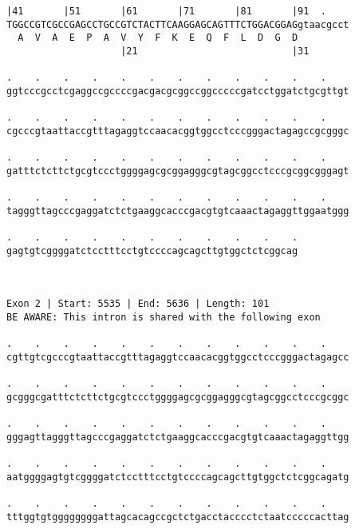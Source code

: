 \documentclass{article}
\begin{document}
\begin{Verbatim}
|41       |51       |61       |71       |81       |91  .    
TGGCCGTCGCCGAGCCTGCCGTCTACTTCAAGGAGCAGTTTCTGGACGGAGgtaacgcct
  A  V  A  E  P  A  V  Y  F  K  E  Q  F  L  D  G  D         
                    |21                           |31       
  
.    .    .    .    .    .    .    .    .    .    .    .    
ggtcccgcctcgaggccgccccgacgacgcggccggcccccgatcctggatctgcgttgt
                                                            
.    .    .    .    .    .    .    .    .    .    .    .    
cgcccgtaattaccgtttagaggtccaacacggtggcctcccgggactagagccgcgggc
                                                            
.    .    .    .    .    .    .    .    .    .    .    .    
gatttctcttctgcgtccctggggagcgcggagggcgtagcggcctcccgcggcgggagt
                                                            
.    .    .    .    .    .    .    .    .    .    .    .    
tagggttagcccgaggatctctgaaggcacccgacgtgtcaaactagaggttggaatggg
                                                            
.    .    .    .    .    .    .    .    .    .    .
gagtgtcggggatctcctttcctgtccccagcagcttgtggctctcggcag
                                                   
                                                   
 
Exon 2 | Start: 5535 | End: 5636 | Length: 101
BE AWARE: This intron is shared with the following exon
 
.    .    .    .    .    .    .    .    .    .    .    .    
cgttgtcgcccgtaattaccgtttagaggtccaacacggtggcctcccgggactagagcc
                                                            
.    .    .    .    .    .    .    .    .    .    .    .    
gcgggcgatttctcttctgcgtccctggggagcgcggagggcgtagcggcctcccgcggc
                                                            
.    .    .    .    .    .    .    .    .    .    .    .    
gggagttagggttagcccgaggatctctgaaggcacccgacgtgtcaaactagaggttgg
                                                            
.    .    .    .    .    .    .    .    .    .    .    .    
aatggggagtgtcggggatctcctttcctgtccccagcagcttgtggctctcggcagatg
                                                            
.    .    .    .    .    .    .    .    .    .    .    .    
tttggtgtggggggggattagcacagccgctctgacctacccctctaatcccccacttag
                                                            

\end{Verbatim}
\end{document}

